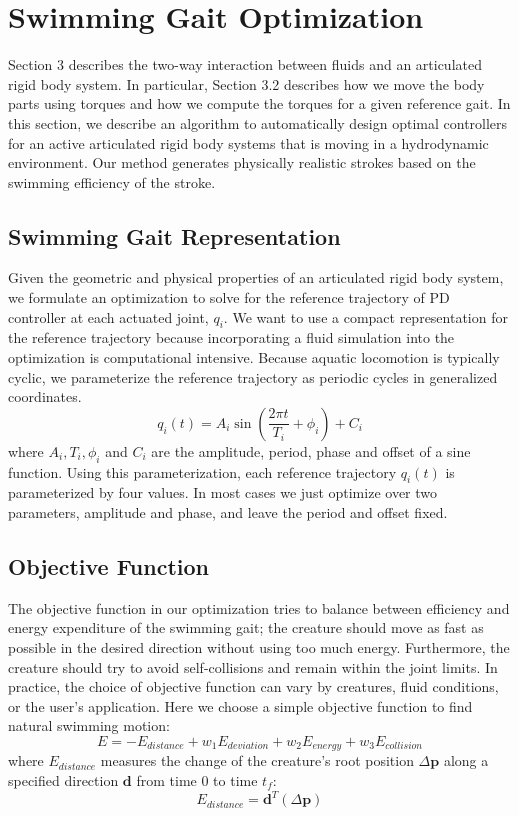 \section{Swimming Gait Optimization}
\label{sec:optimization}

Section 3 describes the two-way interaction between fluids and an articulated rigid body system. In particular, Section 3.2 describes how we move the body parts using torques and how we compute the torques for a given reference gait. In this section, we describe an algorithm to automatically design optimal controllers for an active articulated
rigid body systems that is moving in a hydrodynamic environment.  Our
method generates physically realistic strokes based on the swimming
efficiency of the stroke.

\subsection{Swimming Gait Representation}

Given the geometric and physical properties of an articulated rigid body
system, we formulate an optimization to solve for the reference trajectory
of PD controller at each actuated joint, $q_i$.  We want to use a
compact representation for the reference trajectory because
incorporating a fluid simulation into the optimization is computational
intensive. Because aquatic locomotion is typically cyclic, we parameterize
the reference trajectory as periodic cycles in generalized coordinates.
\begin{displaymath}
q_i(t)=A_i\sin(\frac{2\pi t}{T_i}+\phi_i)+C_i
\end{displaymath}
where $A_i, T_i, \phi_i$ and $C_i$ are the amplitude, period, phase and
offset of a sine function. Using this parameterization, each reference
trajectory $q_i(t)$ is parameterized by four values.  In most cases we
just optimize over two parameters, amplitude and phase, and leave the
period and offset fixed.

\subsection{Objective Function}

The objective function in our optimization tries to balance between
efficiency and energy expenditure of the swimming gait; the creature
should move as fast as possible in the desired direction without using too
much energy. Furthermore, the creature should try to avoid self-collisions
and remain within the joint limits. In practice, the choice of objective
function can vary by creatures, fluid conditions, or the user's
application. Here we choose a simple objective function to find natural
swimming motion:
\begin{equation}
\label{eq:objFunc}
E=-E_{distance}+w_1E_{deviation}+w_2E_{energy}+w_3E_{collision}
\end{equation}
where $E_{distance}$ measures the change of the creature's root position $\Delta\mathbf{p}$ along a specified direction $\mathbf{d}$ from time 0 to time $t_f$:
\begin{displaymath}
E_{distance}=\mathbf{d}^T(\Delta\mathbf{p})
\end{displaymath}

